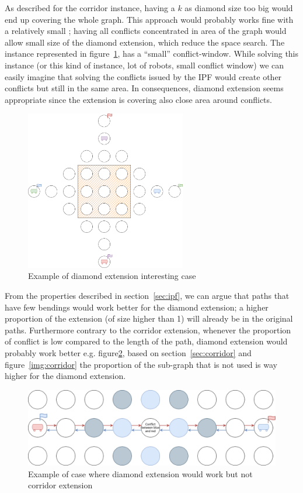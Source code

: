 As described for the corridor instance, having a \(k\) as diamond size too big would end up covering the whole graph. This approach would probably works fine with a relatively small ; having all conflicts concentrated in area of the graph would allow small size of the diamond extension, which reduce the space search. The instance represented in figure~\ref{img:diamond_case}, has a ``small'' conflict-window. While solving this instance (or this kind of instance, lot of robots, small conflict window) we can easily imagine that solving the conflicts issued by the IPF would create other conflicts but still in the same area. In consequences, diamond extension seems appropriate since the extension is covering also close area around conflicts. 
\begin{figure}[H]
  \centering
  \caption{Example of diamond extension interesting case }\label{img:diamond_case}
  \includegraphics[width=7cm]{img/diamond_extension_case_example.drawio.png}
\end{figure}

From the properties described in section~\ref{sec:ipf}, we can argue that paths that have few bendings would work better for the diamond extension; a higher proportion of the extension (of size higher than 1) will already be in the original paths. Furthermore contrary to the corridor extension, whenever the proportion of conflict is low compared to the length of the path, diamond extension would probably work better e.g. figure\ref{img:diamond_vs_corridor}, based on section~\ref{sec:corridor} and figure~\ref{img:corridor} the proportion of the sub-graph that is not used is way higher for the diamond extension.

\begin{figure}[H]
  \centering
  \caption{Example of case where diamond extension would work but not corridor extension}\label{img:diamond_vs_corridor}
  \includegraphics[width=\widthimg]{img/diamond_vs_corridor.drawio.png}
\end{figure}





